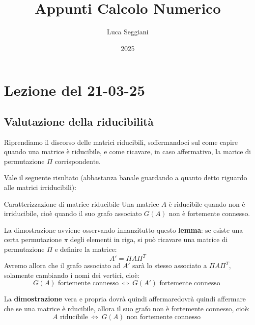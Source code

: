 \documentclass[a4paper,11pt]{article}
\title{Appunti Calcolo Numerico}
\author{Luca Seggiani}
\date{2025}
\begin{document}
\section{Lezione del 21-03-25}

\thispagestyle{empty}
\pagestyle{fancy}

\subsection{Valutazione della riducibilità}
Riprendiamo il discorso delle matrici riducibili, soffermandoci sul come capire quando una matrice è riducibile, e come ricavare, in caso affermativo, la marice di permutazione $\Pi$ corrispondente.

Vale il seguente risultato (abbastanza banale guardando a quanto detto riguardo alle matrici irriducibili):
\begin{theorem}{Caratterizzazione di matrice riducibile}
	Una matrice $A$ è riducibile quando non è irriducibile, cioè quando il suo grafo associato $G(A)$ non è fortemente connesso.
\end{theorem}

La dimostrazione avviene osservando innanzitutto questo \textbf{lemma}: se esiste una certa permutazione $\pi$ degli elementi in riga, si può ricavare una matrice di permutazione $\Pi$ e definire la matrice:
$$
A' = \Pi A \Pi^T
$$
Avremo allora che il grafo associato ad $A'$ sarà lo stesso associato a $\Pi A \Pi^T$, solamente cambiando i nomi dei vertici, cioè:
$$
G(A) \text{ fortemente connesso} \ \Leftrightarrow \  G(A') \text{ fortemente connesso }
$$

La \textbf{dimostrazione} vera e propria dovrà quindi affermaredovrà quindi affermare che se una matrice è rducibile, allora il suo grafo non è fortemente connesso, cioè:
$$
A \text{ riducibile} \ \Leftrightarrow \  G(A) \text{ non fortemente connesso }
$$
\end{document}
